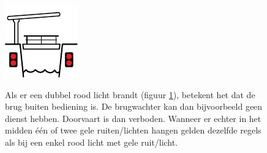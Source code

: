\begin{figure}[H]
	\centering
	\begin{minipage}[b]{0.18\textwidth}
		\includegraphics[width=\textwidth]{Hoofdstukken/Bruggen/pdf/brug_buiten_dienst.pdf}
		\caption{}
		\label{pic:brug:buiten}
	\end{minipage}
	\hfill
	\begin{minipage}[t]{0.75\textwidth}
		\vspace{-2.5cm}
		Als er een dubbel rood licht brandt (figuur \ref{pic:brug:buiten}), betekent het dat de brug buiten bediening is. De brugwachter kan dan bijvoorbeeld geen dienst hebben. Doorvaart is dan verboden. Wanneer er echter in het midden één of twee gele ruiten/lichten hangen gelden dezelfde regels als bij een enkel rood licht met gele ruit/licht.
	\end{minipage}
\end{figure}
\vspace{-0.75cm}
